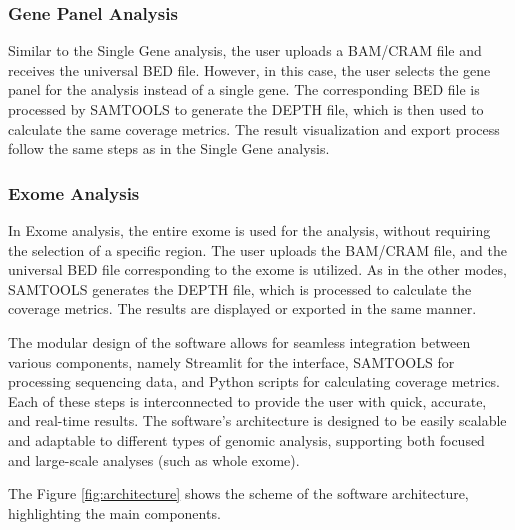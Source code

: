 \subsubsection{\textbf{Gene Panel Analysis}}

Similar to the Single Gene analysis, the user uploads a BAM/CRAM file and receives the universal BED file. However, in this case, the user selects the gene panel for the analysis instead of a single gene. The corresponding BED file is processed by SAMTOOLS to generate the DEPTH file, which is then used to calculate the same coverage metrics. The result visualization and export process follow the same steps as in the Single Gene analysis.


\subsubsection{\textbf{Exome Analysis}}

In Exome analysis, the entire exome is used for the analysis, without requiring the selection of a specific region. The user uploads the BAM/CRAM file, and the universal BED file corresponding to the exome is utilized. As in the other modes, SAMTOOLS generates the DEPTH file, which is processed to calculate the coverage metrics. The results are displayed or exported in the same manner.


The modular design of the software allows for seamless integration between various components, namely Streamlit for the interface, SAMTOOLS for processing sequencing data, and Python scripts for calculating coverage metrics. Each of these steps is interconnected to provide the user with quick, accurate, and real-time results. The software's architecture is designed to be easily scalable and adaptable to different types of genomic analysis, supporting both focused and large-scale analyses (such as whole exome).

The Figure \ref{fig:architecture} shows the scheme of the software architecture, highlighting the main components.

